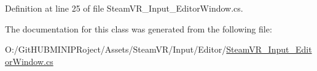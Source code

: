Definition at line 25 of file Steam\+V\+R\+\_\+\+Input\+\_\+\+Editor\+Window.\+cs.



The documentation for this class was generated from the following file\+:\begin{DoxyCompactItemize}
\item 
O\+:/\+Git\+H\+U\+B\+M\+I\+N\+I\+P\+Roject/\+Assets/\+Steam\+V\+R/\+Input/\+Editor/\mbox{\hyperlink{_steam_v_r___input___editor_window_8cs}{Steam\+V\+R\+\_\+\+Input\+\_\+\+Editor\+Window.\+cs}}\end{DoxyCompactItemize}
